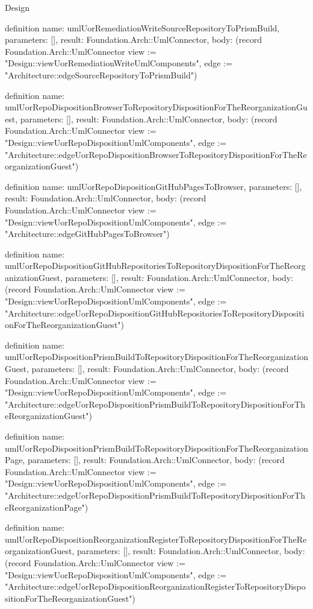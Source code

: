 \begin{lexlean}{Design}
\begin{semanticmodule}
definition{
  name: umlUorRemediationWriteSourceRepositoryToPrismBuild,
  parameters: [],
  result: Foundation.Arch::UmlConnector,
  body: (record Foundation.Arch::UmlConnector {view := "Design::viewUorRemediationWriteUmlComponents", edge := "Architecture::edgeSourceRepositoryToPrismBuild"})
}

definition{
  name: umlUorRepoDispositionBrowserToRepositoryDispositionForTheReorganizationGuest,
  parameters: [],
  result: Foundation.Arch::UmlConnector,
  body: (record Foundation.Arch::UmlConnector {view := "Design::viewUorRepoDispositionUmlComponents", edge := "Architecture::edgeUorRepoDispositionBrowserToRepositoryDispositionForTheReorganizationGuest"})
}

definition{
  name: umlUorRepoDispositionGitHubPagesToBrowser,
  parameters: [],
  result: Foundation.Arch::UmlConnector,
  body: (record Foundation.Arch::UmlConnector {view := "Design::viewUorRepoDispositionUmlComponents", edge := "Architecture::edgeGitHubPagesToBrowser"})
}

definition{
  name: umlUorRepoDispositionGitHubRepositoriesToRepositoryDispositionForTheReorganizationGuest,
  parameters: [],
  result: Foundation.Arch::UmlConnector,
  body: (record Foundation.Arch::UmlConnector {view := "Design::viewUorRepoDispositionUmlComponents", edge := "Architecture::edgeUorRepoDispositionGitHubRepositoriesToRepositoryDispositionForTheReorganizationGuest"})
}

definition{
  name: umlUorRepoDispositionPrismBuildToRepositoryDispositionForTheReorganizationGuest,
  parameters: [],
  result: Foundation.Arch::UmlConnector,
  body: (record Foundation.Arch::UmlConnector {view := "Design::viewUorRepoDispositionUmlComponents", edge := "Architecture::edgeUorRepoDispositionPrismBuildToRepositoryDispositionForTheReorganizationGuest"})
}

definition{
  name: umlUorRepoDispositionPrismBuildToRepositoryDispositionForTheReorganizationPage,
  parameters: [],
  result: Foundation.Arch::UmlConnector,
  body: (record Foundation.Arch::UmlConnector {view := "Design::viewUorRepoDispositionUmlComponents", edge := "Architecture::edgeUorRepoDispositionPrismBuildToRepositoryDispositionForTheReorganizationPage"})
}

definition{
  name: umlUorRepoDispositionReorganizationRegisterToRepositoryDispositionForTheReorganizationGuest,
  parameters: [],
  result: Foundation.Arch::UmlConnector,
  body: (record Foundation.Arch::UmlConnector {view := "Design::viewUorRepoDispositionUmlComponents", edge := "Architecture::edgeUorRepoDispositionReorganizationRegisterToRepositoryDispositionForTheReorganizationGuest"})
}


\end{semanticmodule}
\end{lexlean}
